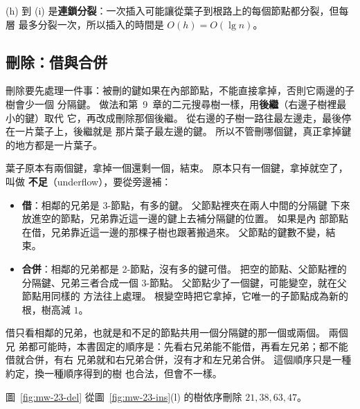 (h) 到 (i) 是\textbf{連鎖分裂}：一次插入可能讓從葉子到根路上的每個節點都分裂，但每層
最多分裂一次，所以插入的時間是 $O(h) = O(\lg n)$。

\subsection{刪除：借與合併}
\label{sec:mw-23-delete}

刪除要先處理一件事：被刪的鍵如果在內部節點，不能直接拿掉，否則它兩邊的子樹會少一個
分隔鍵。 做法和第~9~章的二元搜尋樹一樣，用\textbf{後繼}（右邊子樹裡最小的鍵）取代
它，再改成刪除那個後繼。 從右邊的子樹一路往最左邊走，最後停在一片葉子上，後繼就是
那片葉子最左邊的鍵。 所以不管刪哪個鍵，真正拿掉鍵的地方都是一片葉子。

葉子原本有兩個鍵，拿掉一個還剩一個，結束。 原本只有一個鍵，拿掉就空了，叫做
\textbf{不足}（underflow），要從旁邊補：

\begin{itemize}
\item \textbf{借}：相鄰的兄弟是 3-節點，有多的鍵。 父節點裡夾在兩人中間的分隔鍵
下來放進空的節點，兄弟靠近這一邊的鍵上去補分隔鍵的位置。 如果是內
部節點在借，兄弟靠近這一邊的那棵子樹也跟著搬過來。 父節點的鍵數不變，結束。
\item \textbf{合併}：相鄰的兄弟都是 2-節點，沒有多的鍵可借。 把空的節點、父節點裡的
分隔鍵、兄弟三者合成一個 3-節點。 父節點少了一個鍵，可能變空，就在父節點用同樣的
方法往上處理。 根變空時把它拿掉，它唯一的子節點成為新的根，樹高減 $1$。
\end{itemize}

借只看相鄰的兄弟，也就是和不足的節點共用一個分隔鍵的那一個或兩個。 兩個兄
弟都可能時，本書固定的順序是：先看右兄弟能不能借，再看左兄弟；都不能借就合併，有右
兄弟就和右兄弟合併，沒有才和左兄弟合併。 這個順序只是一種約定，換一種順序得到的樹
也合法，但會不一樣。

圖~\ref{fig:mw-23-del} 從圖~\ref{fig:mw-23-ins}(l) 的樹依序刪除 $21, 38, 63, 47$。

